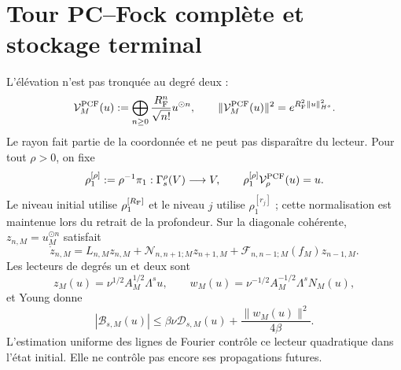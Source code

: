 \section{Tour PC--Fock complète et stockage terminal}

L'élévation n'est pas tronquée au degré deux :
\begin{equation}\label{eq:pdf2-ns-pcf}
 \mathcal V_M^{\rm PCF}(u)
 :=\bigoplus_{n\ge0}\frac{R_{\rm F}^n}{\sqrt{n!}}u^{\odot n},
 \qquad
 \|\mathcal V_M^{\rm PCF}(u)\|^2
 =e^{R_{\rm F}^2\|u\|_{H^s}^2}.
\end{equation}
Le rayon fait partie de la coordonnée et ne peut pas disparaître du lecteur. Pour
tout $\rho>0$, on fixe
\begin{equation}\label{eq:pdf2-ns-normalized-degree-one-reader}
 \rho^{[\rho]}_1:=\rho^{-1}\pi_1:
 \Gamma_s^\rho(V)\longrightarrow V,
 \qquad
 \rho^{[\rho]}_1\mathcal V_\rho^{\rm PCF}(u)=u.
\end{equation}
Le niveau initial utilise $\rho^{[R_{\rm F}]}_1$ et le niveau $j$ utilise
$\rho^{[r_j]}_1$ ; cette normalisation est maintenue lors du retrait de la profondeur.
Sur la diagonale cohérente, $z_{n,M}=u_M^{\odot n}$ satisfait
\begin{equation}\label{eq:pdf2-ns-carleman}
 \dot z_{n,M}=L_{n,M}z_{n,M}
 +\mathcal N_{n,n+1;M}z_{n+1,M}
 +\mathcal F_{n,n-1;M}(f_M)z_{n-1,M}.
\end{equation}
Les lecteurs de degrés un et deux sont
\[
 z_M(u)=\nu^{1/2}A_M^{1/2}\Lambda^su,
 \qquad
 w_M(u)=\nu^{-1/2}A_M^{-1/2}\Lambda^sN_M(u),
\]
et Young donne
\begin{equation}\label{eq:pdf2-ns-young-port}
 |\mathscr B_{s,M}(u)|\le
 \beta\nu\mathscr D_{s,M}(u)+\frac{\|w_M(u)\|^2}{4\beta}.
\end{equation}
L'estimation uniforme des lignes de Fourier contrôle ce lecteur quadratique dans
l'état initial. Elle ne contrôle pas encore ses propagations futures.

